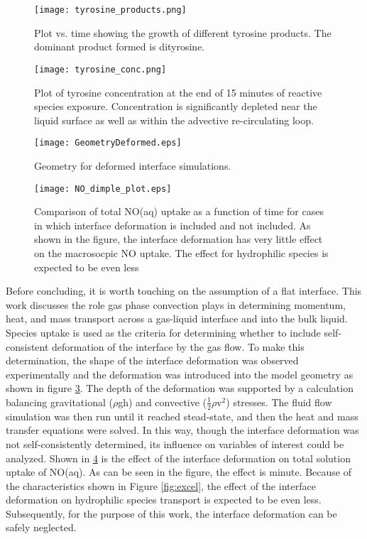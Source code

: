\begin{figure}[htb]
    \centering
    \texttt{[image: tyrosine\_products.png]}
    \caption{Plot vs. time showing the growth of different tyrosine products. The dominant product formed is dityrosine.}
    \label{fig:tyr_products}
\end{figure}

\begin{figure}[htb]
    \centering
    \texttt{[image: tyrosine\_conc.png]}
    \caption{Plot of tyrosine concentration at the end of 15 minutes of reactive species exposure. Concentration is significantly depleted near the liquid surface as well as within the advective re-circulating loop.}
    \label{fig:tyr_conc}
\end{figure}

\begin{figure}[htb]
    \centering
    \texttt{[image: GeometryDeformed.eps]}
    \caption{Geometry for deformed interface simulations.}
    \label{fig:deformed_geom}
\end{figure}

\begin{figure}[htb]
    \centering
    \texttt{[image: NO\_dimple\_plot.eps]}
    \caption{Comparison of total NO(aq) uptake as a function of time for cases in which interface deformation is included and not included. As shown in the figure, the interface deformation has very little effect on the macrosocpic NO uptake. The effect for hydrophilic species is expected to be even less}
    \label{fig:NO_deform_compare}
\end{figure}

Before concluding, it is worth touching on the assumption of a flat interface. This work discusses the role gas phase convection plays in determining momentum, heat, and mass transport across a gas-liquid interface and into the bulk liquid. Species uptake is used as the criteria for determining whether to include self-consistent deformation of the interface by the gas flow. To make this determination, the shape of the interface deformation was observed experimentally and the deformation was introduced into the model geometry as shown in figure \ref{fig:deformed_geom}. The depth of the deformation was supported by a calculation balancing gravitational ($\rho$gh) and convective ($\frac{1}{2}\rho$v$^2$) stresses. The fluid flow simulation was then run until it reached stead-state, and then the heat and mass transfer equations were solved. In this way, though the interface deformation was not self-consistently determined, its influence on variables of interest could be analyzed. Shown in \ref{fig:NO_deform_compare} is the effect of the interface deformation on total solution uptake of NO(aq). As can be seen in the figure, the effect is minute. Because of the characteristics shown in Figure \ref{fig:excel}, the effect of the interface deformation on hydrophilic species transport is expected to be even less. Subsequently, for the purpose of this work, the interface deformation can be safely neglected.


